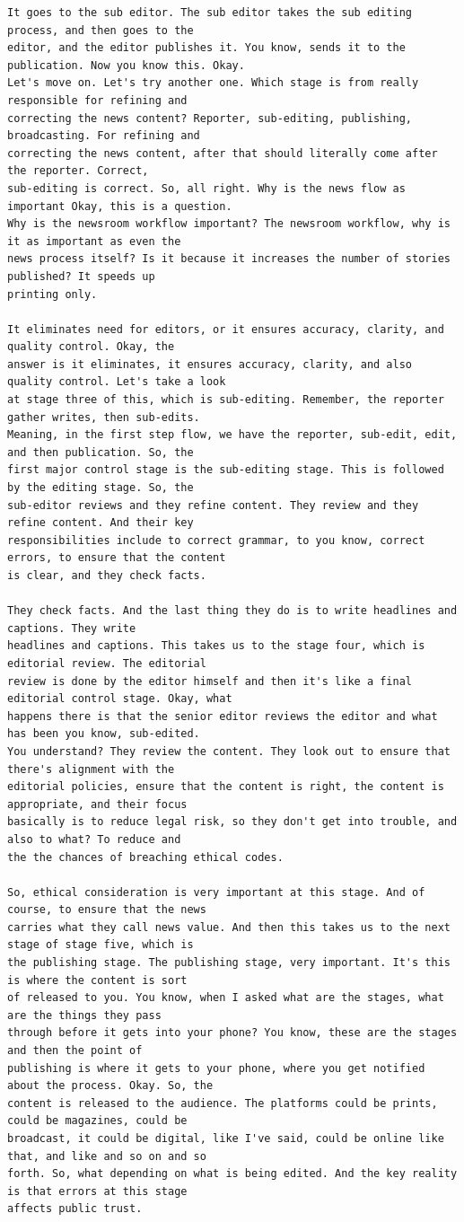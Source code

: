 {\begin{Verbatim}
It goes to the sub editor. The sub editor takes the sub editing process, and then goes to the
editor, and the editor publishes it. You know, sends it to the publication. Now you know this. Okay.
Let's move on. Let's try another one. Which stage is from really responsible for refining and
correcting the news content? Reporter, sub-editing, publishing, broadcasting. For refining and
correcting the news content, after that should literally come after the reporter. Correct,
sub-editing is correct. So, all right. Why is the news flow as important Okay, this is a question.
Why is the newsroom workflow important? The newsroom workflow, why is it as important as even the
news process itself? Is it because it increases the number of stories published? It speeds up
printing only.

It eliminates need for editors, or it ensures accuracy, clarity, and quality control. Okay, the
answer is it eliminates, it ensures accuracy, clarity, and also quality control. Let's take a look
at stage three of this, which is sub-editing. Remember, the reporter gather writes, then sub-edits.
Meaning, in the first step flow, we have the reporter, sub-edit, edit, and then publication. So, the
first major control stage is the sub-editing stage. This is followed by the editing stage. So, the
sub-editor reviews and they refine content. They review and they refine content. And their key
responsibilities include to correct grammar, to you know, correct errors, to ensure that the content
is clear, and they check facts.

They check facts. And the last thing they do is to write headlines and captions. They write
headlines and captions. This takes us to the stage four, which is editorial review. The editorial
review is done by the editor himself and then it's like a final editorial control stage. Okay, what
happens there is that the senior editor reviews the editor and what has been you know, sub-edited.
You understand? They review the content. They look out to ensure that there's alignment with the
editorial policies, ensure that the content is right, the content is appropriate, and their focus
basically is to reduce legal risk, so they don't get into trouble, and also to what? To reduce and
the the chances of breaching ethical codes.

So, ethical consideration is very important at this stage. And of course, to ensure that the news
carries what they call news value. And then this takes us to the next stage of stage five, which is
the publishing stage. The publishing stage, very important. It's this is where the content is sort
of released to you. You know, when I asked what are the stages, what are the things they pass
through before it gets into your phone? You know, these are the stages and then the point of
publishing is where it gets to your phone, where you get notified about the process. Okay. So, the
content is released to the audience. The platforms could be prints, could be magazines, could be
broadcast, it could be digital, like I've said, could be online like that, and like and so on and so
forth. So, what depending on what is being edited. And the key reality is that errors at this stage
affects public trust.


\end{Verbatim}}
